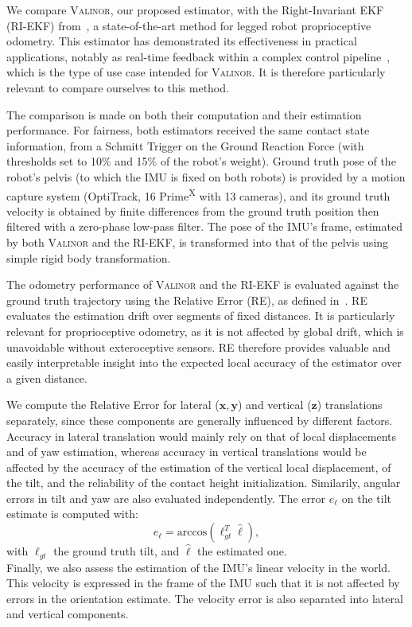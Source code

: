 \documentclass{IJCAS}
\begin{document}
\noindent We compare {\scshape Valinor}, our proposed estimator, with the Right-Invariant EKF (RI-EKF) from~\cite{Hartley2020RIEKF}, a state-of-the-art method for legged robot proprioceptive odometry. This estimator has demonstrated its effectiveness in practical applications, notably as real-time feedback within a complex control pipeline~\cite{Grandia2024DesignControlBipedalRoboticCharacter}, which is the type of use case intended for {\scshape Valinor}. It is therefore particularly relevant to compare ourselves to this method.

The comparison is made on both their computation and their estimation performance. For fairness, both estimators received the same contact state information, from a Schmitt Trigger on the Ground Reaction Force (with thresholds set to 10\% and 15\% of the robot's weight).
Ground truth pose of the robot's pelvis (to which the IMU is fixed on both robots) is provided by a motion capture system (OptiTrack, 16 Prime\textsuperscript{X} with 13 cameras), and its ground truth velocity is obtained by finite differences from the ground truth position then filtered with a zero-phase low-pass filter. The pose of the IMU's frame, estimated by both {\scshape Valinor} and the RI-EKF, is transformed into that of the pelvis using simple rigid body transformation.

The odometry performance of {\scshape Valinor} and the RI-EKF is evaluated against the ground truth trajectory using the Relative Error (RE), as defined in~\cite{Zhang2018QuantitativeTrajectoryEvaluation}. RE evaluates the estimation drift over segments of fixed distances. It is particularly relevant for proprioceptive odometry, as it is not affected by global drift, which is unavoidable without exteroceptive sensors. RE therefore provides valuable and easily interpretable insight into the expected local accuracy of the estimator over a given distance.

We compute the Relative Error for lateral ($\boldsymbol{x}, \boldsymbol{y}$) and vertical ($\boldsymbol{z}$) translations separately, since these components are generally influenced by different factors. Accuracy in lateral translation would mainly rely on that of local displacements and of yaw estimation, whereas accuracy in vertical translations would be affected by the accuracy of the estimation of the vertical local displacement, of the tilt, and the reliability of the contact height initialization. Similarily, angular errors in tilt and yaw are also evaluated independently.
The error $e_{\boldsymbol{\ell}}$ on the tilt estimate is computed with:
\begin{equation}
    e_{\boldsymbol{\ell}} = \text{arccos}\left(\boldsymbol{\ell}_{gt}^{T} \hat{\boldsymbol{\ell}} \right),
\end{equation}
with $\boldsymbol{\ell}_{gt}$ the ground truth tilt, and $\hat{\boldsymbol{\ell}}$ the estimated one.\\
Finally, we also assess the estimation of the IMU's linear velocity in the world. This velocity is expressed in the frame of the IMU such that it is not affected by errors in the orientation estimate. The velocity error is also separated into lateral and vertical components.
\end{document}
